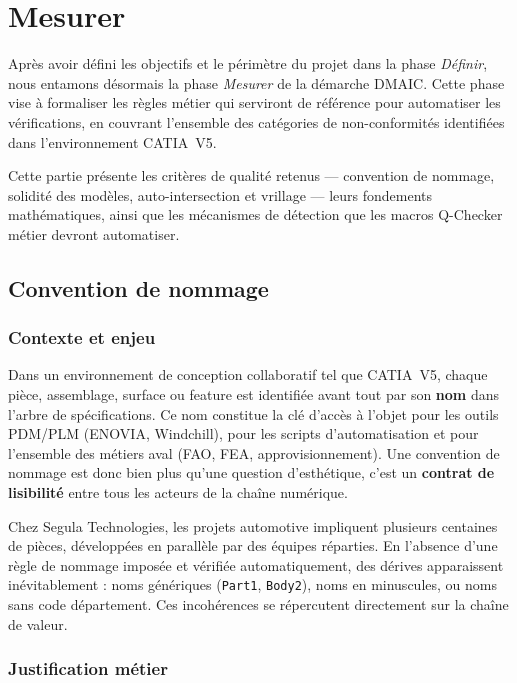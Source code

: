 
\chapter{Mesurer}
\label{cp:mesurer}

Après avoir défini les objectifs et le périmètre du projet dans la phase \textit{Définir}, nous entamons désormais la phase \textit{Mesurer} de la démarche DMAIC. Cette phase vise à formaliser les règles métier qui serviront de référence pour automatiser les vérifications, en couvrant l'ensemble des catégories de non-conformités identifiées dans l'environnement CATIA~V5.

Cette partie présente les critères de qualité retenus --- convention de nommage, solidité des modèles, auto-intersection et vrillage --- leurs fondements mathématiques, ainsi que les mécanismes de détection que les macros Q-Checker métier devront automatiser.

\section{Convention de nommage}

\subsection{Contexte et enjeu}

Dans un environnement de conception collaboratif tel que CATIA~V5, chaque pièce, assemblage, surface ou feature est identifiée avant tout par son \textbf{nom} dans l'arbre de spécifications. Ce nom constitue la clé d'accès à l'objet pour les outils PDM/PLM (ENOVIA, Windchill), pour les scripts d'automatisation et pour l'ensemble des métiers aval (FAO, FEA, approvisionnement). Une convention de nommage est donc bien plus qu'une question d'esthétique, c'est un \textbf{contrat de lisibilité} entre tous les acteurs de la chaîne numérique.

Chez Segula Technologies, les projets automotive impliquent plusieurs centaines de pièces, développées en parallèle par des équipes réparties. En l'absence d'une règle de nommage imposée et vérifiée automatiquement, des dérives apparaissent inévitablement : noms génériques (\texttt{Part1}, \texttt{Body2}), noms en minuscules, ou noms sans code département. Ces incohérences se répercutent directement sur la chaîne de valeur.

\subsection{Justification métier}

